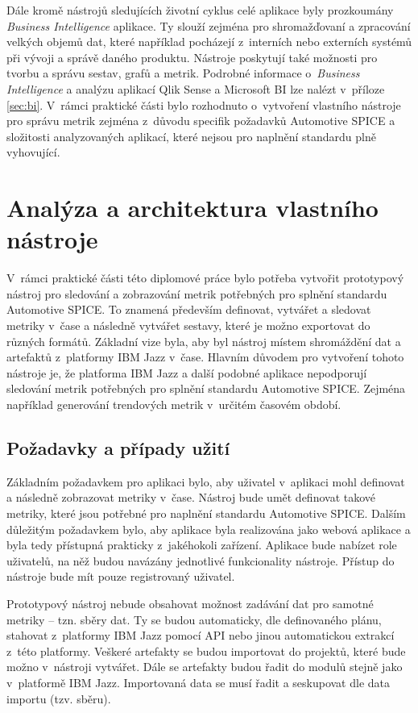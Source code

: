 \documentclass[czech,master]{diploma}
\begin{document}
Dále kromě nástrojů sledujících životní cyklus celé aplikace byly prozkoumány \textit{Business Intelligence} aplikace. Ty slouží zejména pro shromažďovaní a zpracování velkých objemů dat, které například pocházejí z~interních nebo externích systémů při vývoji a správě daného produktu. Nástroje poskytují také možnosti pro tvorbu a správu sestav, grafů a metrik. Podrobné informace o~\textit{Business Intelligence} a analýzu aplikací Qlik Sense a Microsoft BI lze nalézt v~příloze \ref{sec:bi}. V~rámci praktické části bylo rozhodnuto o~vytvoření vlastního nástroje pro správu metrik zejména z~důvodu specifik požadavků Automotive SPICE a složitosti analyzovaných aplikací, které nejsou pro naplnění standardu plně vyhovující.

\chapter{Analýza a architektura vlastního nástroje}
\label{sec:my_app}
V~rámci  praktické části této diplomové práce bylo potřeba vytvořit  prototypový nástroj pro sledování a zobrazování metrik potřebných pro splnění standardu Automotive SPICE. To znamená především definovat, vytvářet a sledovat metriky v~čase a následně vytvářet sestavy, které je možno exportovat do různých formátů. Základní vize byla, aby byl nástroj místem shromáždění dat a artefaktů z~platformy IBM Jazz v~čase. Hlavním důvodem pro vytvoření tohoto nástroje je, že platforma IBM Jazz a další podobné aplikace nepodporují sledování metrik potřebných pro splnění standardu Automotive SPICE. Zejména například generování trendových metrik v~určitém časovém období.

\section{Požadavky a případy užití}
\label{sec:requirements}
Základním požadavkem pro aplikaci bylo, aby uživatel v~aplikaci mohl definovat a následně zobrazovat metriky v~čase. Nástroj bude umět definovat takové metriky, které jsou potřebné pro naplnění standardu Automotive SPICE. Dalším důležitým požadavkem bylo, aby aplikace byla realizována jako webová aplikace a byla tedy přístupná prakticky z~jakéhokoli zařízení. Aplikace bude nabízet role uživatelů, na něž budou navázány jednotlivé funkcionality nástroje. Přístup do nástroje bude mít pouze registrovaný uživatel.

Prototypový nástroj nebude obsahovat možnost zadávání dat pro samotné metriky -- tzn. sběry dat. Ty se budou automaticky, dle definovaného plánu, stahovat z~platformy IBM Jazz pomocí API nebo jinou automatickou extrakcí z~této platformy. Veškeré artefakty se budou importovat do projektů, které bude možno v~nástroji vytvářet. Dále se artefakty budou řadit do modulů stejně jako v~platformě IBM Jazz. Importovaná data se musí řadit a seskupovat dle data importu (tzv. sběru).
\end{document}
